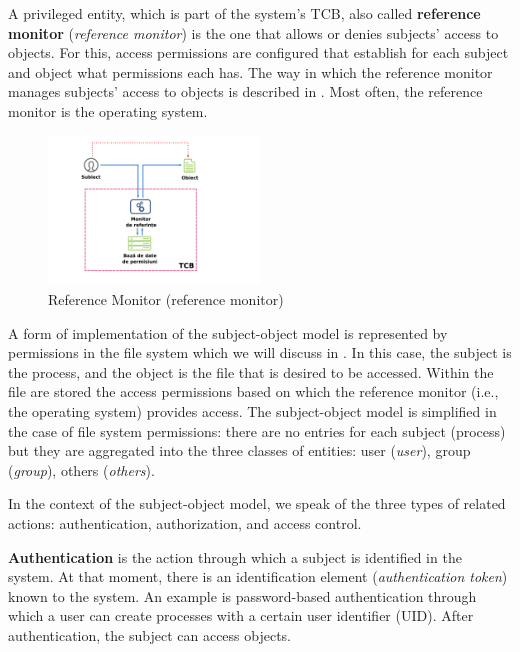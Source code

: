 A privileged entity, which is part of the system's TCB, also called \textbf{reference monitor} (\textit{reference monitor}) is the one that allows or denies subjects' access to objects.
For this, access permissions are configured that establish for each subject and object what permissions each has.
The way in which the reference monitor manages subjects' access to objects is described in .
Most often, the reference monitor is the operating system.

\begin{figure}[htbp]
  \centering
  \def\svgwidth{\columnwidth}
  \includegraphics[width=0.5\textwidth]{chapters/12-auth/img/reference-monitor.svg.pdf}
  \caption{Reference Monitor (reference monitor)}
  \label{fig:sec:reference-monitor}
\end{figure}

A form of implementation of the subject-object model is represented by permissions in the file system which we will discuss in .
In this case, the subject is the process, and the object is the file that is desired to be accessed.
Within the file are stored the access permissions based on which the reference monitor (i.e., the operating system) provides access.
The subject-object model is simplified in the case of file system permissions: there are no entries for each subject (process) but they are aggregated into the three classes of entities: user (\textit{user}), group (\textit{group}), others (\textit{others}).

In the context of the subject-object model, we speak of the three types of related actions: authentication, authorization, and access control.

\textbf{Authentication} is the action through which a subject is identified in the system.
At that moment, there is an identification element (\textit{authentication token}) known to the system.
An example is password-based authentication through which a user can create processes with a certain user identifier (UID).
After authentication, the subject can access objects.

